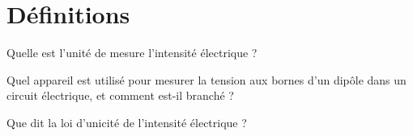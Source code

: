 \section{Définitions}


\begin{questions}
	\question Quelle est l'unité de mesure l'intensité électrique ?
	\fillwithdottedlines{1cm}
	
	\question Quel appareil est utilisé pour mesurer la tension aux bornes d'un dipôle dans un circuit électrique, et comment est-il branché ?
	\fillwithdottedlines{1.5cm}

	\question Que dit la loi d'unicité de l'intensité électrique ?	
	\fillwithdottedlines{2cm}
	
	
\end{questions}
